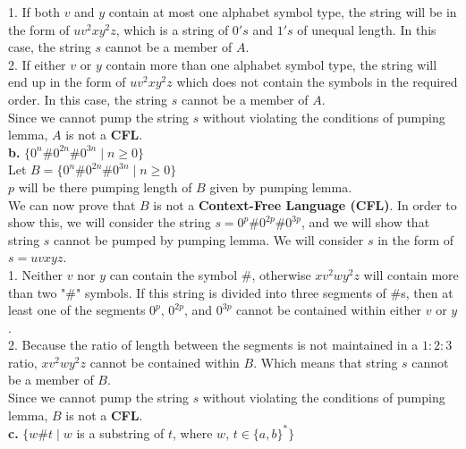 \documentclass[12pt]{article}
\begin{document}
1. If both $v$ and $y$ contain at most one alphabet symbol type, the string
will be in the form of $u v^2 x y^2 z$, which is a string of $0's$ and $1's$ 
of unequal length. In this case, the string $s$ cannot be a member of $A$. \\

2. If either $v$ or $y$ contain more than one alphabet symbol type, the string
will end up in the form of $u v^2 x y^2 z$ which does not contain the
symbols in the required order. In this case, the string $s$ cannot be a
member of $A$. \\

Since we cannot pump the string $s$ without violating the conditions of
pumping lemma, $A$ is not a \textbf{CFL}. \\


\textbf{b.} $\{0^n \# 0^{2n} \# 0^{3n} \; | \; n \geq 0 \} $ \\

Let $B = \{0^n \# 0^{2n} \# 0^{3n} \; | \; n \geq 0 \} $ \\
$p$ will be there pumping length of $B$ given by pumping lemma. \\

We can now prove that $B$ is not a \textbf{Context-Free Language (CFL)}.
In order to show this, we will consider the string $s = 0^p \# 0^{2p} \# 0^{3p}$,
and we will show that string $s$ cannot be pumped by pumping lemma. We will
consider $s$ in the form of $s = uvxyz$. \\

1. Neither $v$ nor $y$ can contain the symbol $\#$, otherwise $x v^2 w y^2 z$
will contain more than two "\#" symbols. If this string is divided into
three segments of $\#$s, then at least one of the segments $0^p$,
$0^{2p}$, and $0^{3p}$ cannot be contained within either $v$ or $y$. \\

2. Because the ratio of length between the segments is not maintained in
a $1:2:3$ ratio, $x v^2 w y^2 z$ cannot be contained within $B$.
Which means that string $s$ cannot be a member of $B$. \\

Since we cannot pump the string $s$ without violating the conditions of
pumping lemma, $B$ is not a \textbf{CFL}. \\


\textbf{c.} $\{ w \# t \; | \; w$ is a substring of $t$, where $w$, $t \in \{a, b\}^* \} $ \\
\end{document}
